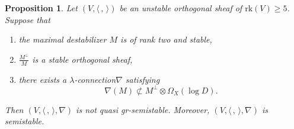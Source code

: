 \documentclass[JEP,XML,SOM,Unicode,published]{cedram}
\newcommand{\lconnection}{$\lambda$\nobreakdash-con\-nec\-tion\xspace}
\newcommand{\grsemistable}{gr\nobreakdash-semi\-stable\xspace}
\newcommand{\rk}{\mathrm{rk}}
\theoremstyle{plain}
\newtheorem{prop}[thm]{Proposition}
\theoremstyle{definition}
\begin{document}
\begin{prop}\label{irregular}
Let $(V, \langle \,, \, \rangle)$ be an unstable orthogonal sheaf of $\rk(V)\geq 5$. Suppose that
\begin{enumerate}
\item the maximal destabilizer $M$ is of rank two and stable,
\item $\frac{M^\perp}{M}$ is a stable orthogonal sheaf,
\item there exists a \lconnection $\nabla$ satisfying\vspace*{-3pt}
\[
\nabla(M)\not \subset M^\perp\otimes\Omega_X(\log D).
\]
\end{enumerate}
Then $(V,\langle \,, \, \rangle,\nabla)$ is not quasi \grsemistable. Moreover, $(V, \langle \,, \, \rangle, \nabla)$ is semistable.
\end{prop}
\end{document}
